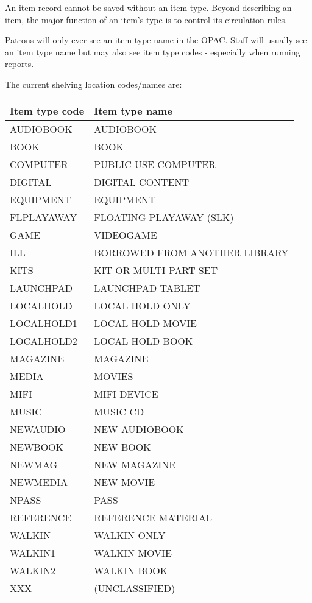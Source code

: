 \documentclass[letterpaper,10pt,english]{sphinxmanual}
\begin{document}
An item record cannot be saved without an item type. Beyond describing
an item, the major function of an item’s type is to control its
circulation rules.

Patrons will only ever see an item type name in the OPAC. Staff will
usually see an item type name but may also see item type codes -
especially when running reports.

The current shelving location codes/names are:


\begin{savenotes}\sphinxattablestart
\centering
\begin{tabulary}{\linewidth}[t]{|T|T|}
\hline
\sphinxstyletheadfamily 
Item type code
&\sphinxstyletheadfamily 
Item type name
\\
\hline
AUDIOBOOK
&
AUDIOBOOK
\\
\hline
BOOK
&
BOOK
\\
\hline
COMPUTER
&
PUBLIC USE COMPUTER
\\
\hline
DIGITAL
&
DIGITAL CONTENT
\\
\hline
EQUIPMENT
&
EQUIPMENT
\\
\hline
FLPLAYAWAY
&
FLOATING PLAYAWAY (SLK)
\\
\hline
GAME
&
VIDEOGAME
\\
\hline
ILL
&
BORROWED FROM ANOTHER LIBRARY
\\
\hline
KITS
&
KIT OR MULTI-PART SET
\\
\hline
LAUNCHPAD
&
LAUNCHPAD TABLET
\\
\hline
LOCALHOLD
&
LOCAL HOLD ONLY
\\
\hline
LOCALHOLD1
&
LOCAL HOLD MOVIE
\\
\hline
LOCALHOLD2
&
LOCAL HOLD BOOK
\\
\hline
MAGAZINE
&
MAGAZINE
\\
\hline
MEDIA
&
MOVIES
\\
\hline
MIFI
&
MIFI DEVICE
\\
\hline
MUSIC
&
MUSIC CD
\\
\hline
NEWAUDIO
&
NEW AUDIOBOOK
\\
\hline
NEWBOOK
&
NEW BOOK
\\
\hline
NEWMAG
&
NEW MAGAZINE
\\
\hline
NEWMEDIA
&
NEW MOVIE
\\
\hline
NPASS
&
PASS
\\
\hline
REFERENCE
&
REFERENCE MATERIAL
\\
\hline
WALKIN
&
WALKIN ONLY
\\
\hline
WALKIN1
&
WALKIN MOVIE
\\
\hline
WALKIN2
&
WALKIN BOOK
\\
\hline
XXX
&
(UNCLASSIFIED)
\\
\hline
\end{tabulary}
\par
\sphinxattableend\end{savenotes}
\end{document}
